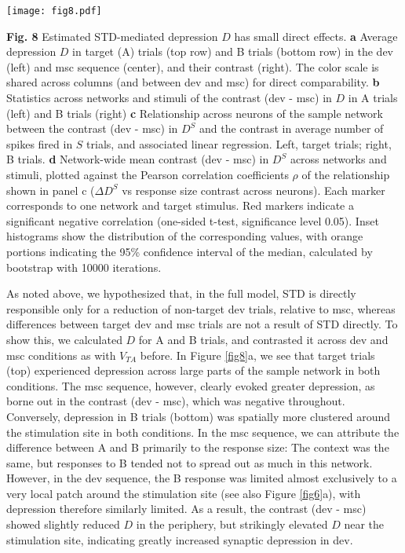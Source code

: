 \documentclass[pdflatex,referee,iicol,sn-basic]{sn-jnl}
\theoremstyle{thmstyleone}%
\theoremstyle{thmstyletwo}%
\theoremstyle{thmstylethree}%
\begin{document}
\begin{figure*}%
    \centering
    \texttt{[image: fig8.pdf]}
    \caption{}
    \label{fig8}
\end{figure*}
\textbf{Fig. 8} Estimated STD-mediated depression $D$ has small direct effects.
\textbf{a} Average depression $D$ in target (A) trials (top row) and B trials (bottom row) in the dev (left) and msc sequence (center), and their contrast (right). The color scale is shared across columns (and between dev and msc) for direct comparability.
\textbf{b} Statistics across networks and stimuli of the contrast (dev - msc) in $D$ in A trials (left) and B trials (right)
\textbf{c} Relationship across neurons of the sample network between the contrast (dev - msc) in $D^S$ and the contrast in average number of spikes fired in $S$ trials, and associated linear regression. Left, target trials; right, B trials.
\textbf{d} Network-wide mean contrast (dev - msc) in $D^S$ across networks and stimuli, plotted against the Pearson correlation coefficients $\rho$ of the relationship shown in panel c ($\Delta D^S$ vs response size contrast across neurons). Each marker corresponds to one network and target stimulus. Red markers indicate a significant negative correlation (one-sided t-test, significance level 0.05). Inset histograms show the distribution of the corresponding values, with orange portions indicating the 95\% confidence interval of the median, calculated by bootstrap with 10000 iterations.

As noted above, we hypothesized that, in the full model, STD is directly responsible only for a reduction of non-target dev trials, relative to msc, whereas differences between target dev and msc trials are not a result of STD directly. To show this, we calculated $D$ for A and B trials, and contrasted it across dev and msc conditions as with $V_{TA}$ before.
In Figure \ref{fig8}a, we see that target trials (top) experienced depression across large parts of the sample network in both conditions. The msc sequence, however, clearly evoked greater depression, as borne out in the contrast (dev - msc), which was negative throughout. Conversely, depression in B trials (bottom) was spatially more clustered around the stimulation site in both conditions. In the msc sequence, we can attribute the difference between A and B primarily to the response size: The context was the same, but responses to B tended not to spread out as much in this network. However, in the dev sequence, the B response was limited almost exclusively to a very local patch around the stimulation site (see also Figure \ref{fig6}a), with depression therefore similarly limited. As a result, the contrast (dev - msc) showed slightly reduced $D$ in the periphery, but strikingly elevated $D$ near the stimulation site, indicating greatly increased synaptic depression in dev.
\end{document}

